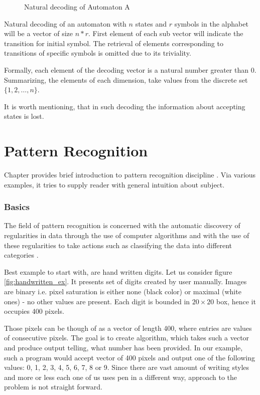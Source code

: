 \documentclass{mini}
\begin{document}
\begin{figure}[H]
\begin{center}
        \caption{Natural decoding of Automaton A}
        \label{fig:encoding}
    \end{center}
\end{figure}

Natural decoding of an automaton with $n$ states and $r$ symbols in the alphabet will be a vector of size $n*r$. First element of each sub vector will indicate the transition for initial symbol. The retrieval of elements corresponding to transitions of specific symbols is omitted due to its triviality.

Formally, each element of the decoding vector is a natural number greater than 0. Summarizing, the elements of each dimension, take values from the discrete set $\{1,2, \ldots, n\}$.

It is worth mentioning, that in such decoding the information about accepting states is lost.


\chapter{Pattern Recognition} \label{chap:patt_rec}

Chapter provides brief introduction to pattern recognition discipline . Via various examples, it tries to supply reader with general intuition about subject. 


\subsection{Basics}

The field of pattern recognition is concerned with the automatic discovery of regularities in data through the use of computer algorithms and with the use of these regularities to take actions such as classifying the data into different categories \cite{bishop_book}.

Best example to start with, are hand written digits. Let us consider figure \ref{fig:handwritten_ex}. It presents set of digits created by user manually. Images are binary i.e. pixel saturation is either none (black color) or maximal (white ones) - no other values are present. Each digit is bounded in $20 \times 20$ box, hence it occupies 400 pixels. 

Those pixels can be though of as a vector of length 400, where entries are values of consecutive pixels. The goal is to create algorithm, which takes such a vector and produce output telling, what number has been provided. In our example, such a program would accept vector of 400 pixels and output one of the following values: 0, 1, 2, 3, 4, 5, 6, 7, 8 or 9. Since there are vast amount of writing styles and more or less each one of us uses pen in a different way, approach to the problem is not straight forward. 
\end{document}
